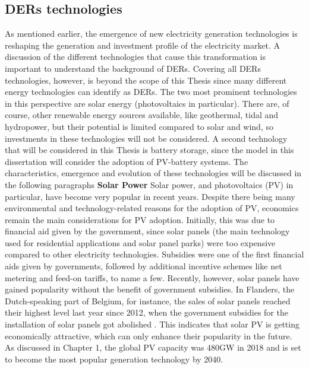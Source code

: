 \subsection{DERs technologies}
 As mentioned earlier, the emergence of new electricity generation technologies is reshaping the generation and investment profile of the electricity market. A discussion of the different technologies that cause this transformation is important to understand the background of DERs. Covering all DERs technologies, however, is beyond the scope of this Thesis since many different energy technologies can identify as DERs. The two most prominent technologies in this perspective are solar energy (photovoltaics in particular). There are, of course, other renewable energy sources available, like geothermal, tidal and hydropower, but their potential is limited compared to solar and wind, so investments in these technologies will not be considered. A second technology that will be considered in this Thesis is battery storage, since the model in this dissertation will consider the adoption of PV-battery systems. The characteristics, emergence and evolution of these technologies will be discussed in the following paragraphs
\newline\newline \noindent
\textbf{Solar Power}
\newline \newline \noindent 
Solar power, and photovoltaics (PV) in particular, have become very popular in recent years. Despite there being many environmental and technology-related reasons for the adoption of PV, economics remain the main considerations for PV adoption. Initially, this was due to financial aid given by the government, since solar panels (the main technology used for residential applications and solar panel parks) were too expensive compared to other electricity technologies. Subsidies were one of the first financial aids given by governments, followed by additional incentive schemes like net metering and feed-on tariffs, to name a few. Recently, however, solar panels have gained popularity without the benefit of government subsidies. In Flanders, the Dutch-speaking part of Belgium, for instance, the sales of solar panels reached their highest level last year since 2012, when the government subsidies for the installation of solar panels got abolished \cite{Zonnepanelen}. This indicates that solar PV is getting economically attractive, which can only enhance their popularity in the future. As discussed in Chapter 1, the global PV capacity was 480GW in 2018 and is set to become the most popular generation technology by 2040. 
